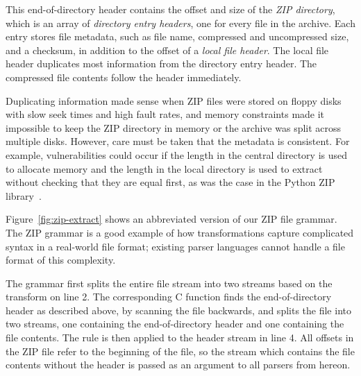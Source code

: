  This end-of-directory
header contains the offset and size of the \emph{ZIP directory}, which
is an array of \emph{directory entry headers}, one for every file
in the archive.  Each entry stores file metadata, such as file name,
compressed and uncompressed size, and a checksum, in addition to the
offset of a \emph{local file header}. The local file header duplicates
most information from the directory entry header. The compressed file
contents follow the header immediately.



Duplicating information made sense when ZIP files were stored on floppy
disks with slow seek times and high fault rates, and memory constraints
made it impossible to keep the ZIP directory in memory or the archive
was split across multiple disks.  However, care must be taken that the
metadata is consistent. For example, vulnerabilities could occur if
the length in the central directory is used to allocate memory and the
length in the local directory is used to extract without checking that
they are equal first, as was the case in the Python ZIP
library~\cite{python-bug:20078}.
\begin{comment}
\begin{figure}[tb]
\smaller[0.5]

\caption{Signatures of stream transform functions for handling the
end-to-beginning structure of ZIP files.}
\label{fig:zip-eod-xform}
\end{figure}
\end{comment}
Figure~\ref{fig:zip-extract} shows an abbreviated version of our ZIP
file grammar.  The ZIP grammar is a good example of how transformations
capture complicated syntax in a real-world file format; existing parser
languages cannot handle a file format of this complexity.

The  grammar first splits the entire file stream into two
streams based on the  transform on line 2.
The corresponding C function
finds the end-of-directory header as described above, by scanning the
file backwards, and splits the file into two streams, one containing
the end-of-directory header and one containing the file contents. The
 rule is then applied to the header stream in
line 4. All offsets in the ZIP file refer to the beginning of the
file, so the stream  which contains the file contents
without the header is passed as an argument to all parsers from
hereon. 

